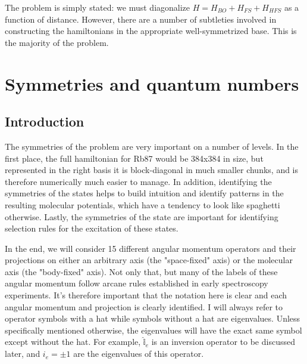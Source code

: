 \documentclass[prl, longbibliography]{revtex4-2}
\begin{document}
The problem is simply stated: we must diagonalize $H=H_{BO}+H_{FS}+H_{HFS}$ as a function of distance. However, there are a number of subtleties involved in constructing the hamiltonians in the appropriate well-symmetrized base. This is the majority of the problem. 

\section{Symmetries and quantum numbers}

\subsection{Introduction}
The symmetries of the problem are very important on a number of levels. 
In the first place, the full hamiltonian for Rb87 would be 384x384 in size, but represented in the right basis it is block-diagonal in much smaller chunks, and is therefore numerically much easier to manage. 
In addition, identifying the symmetries of the states helps to build intuition and identify patterns in the resulting molecular potentials, which have a tendency to look like spaghetti otherwise. 
Lastly, the symmetries of the state are important for identifying selection rules for the excitation of these states.

In the end, we will consider 15 different angular momentum operators and their projections on either an arbitrary axis (the "space-fixed" axis) or the molecular axis (the "body-fixed" axis).  
Not only that, but many of the labels of these angular momentum follow arcane rules established in early spectroscopy experiments. 
It's therefore important that the notation here is clear and each angular momentum and projection is clearly identified. 
I will always refer to operator symbols with a hat while symbols without a hat are eigenvalues. 
Unless specifically mentioned otherwise, the eigenvalues will have the exact same symbol except without the hat. For example, $\hat{\mathbb{i}}_{e}$ is an inversion operator to be discussed later, and $i_e=\pm 1$ are the eigenvalues of this operator. 
\end{document}
